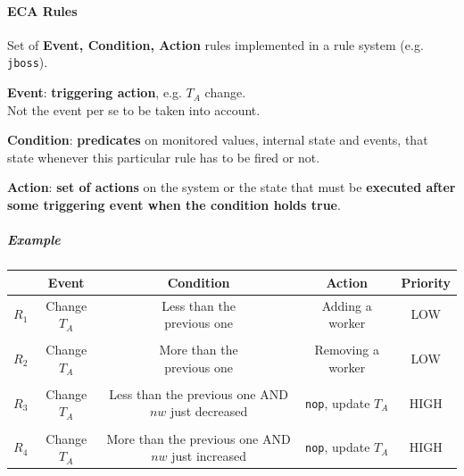 \documentclass[10pt]{report}
\begin{document}
\paragraph{ECA Rules} Set of \textbf{Event, Condition, Action} rules implemented in a rule system (e.g. \texttt{jboss}).\begin{list}{}{}
	\item \textbf{Event}: \textbf{triggering action}, e.g. $T_A$ change.\\
	Not the event per se to be taken into account.
	\item \textbf{Condition}: \textbf{predicates} on monitored values, internal state and events, that state whenever this particular rule has to be fired or not.
	\item \textbf{Action}: \textbf{set of actions} on the system or the state that must be \textbf{executed after some triggering event when the condition holds true}.
\end{list}
\subparagraph{Example}
\begin{center}
	\begin{tabular}{c | c c c c}
	& \textbf{Event} & \textbf{Condition} & \textbf{Action} & \textbf{Priority}\\
	\hline
	$R_1$ & Change $T_A$ & \makecell{Less than the\\previous one} & Adding a worker & LOW\\\\
	$R_2$ & Change $T_A$ & \makecell{More than the\\previous one} & Removing a worker & LOW\\\\
	$R_3$ & Change $T_A$ & \makecell{Less than the\\previous one AND\\$nw$ just decreased} & \texttt{nop}, update $T_A$ & HIGH\\\\
	$R_4$ & Change $T_A$ & \makecell{More than the\\previous one AND\\$nw$ just increased} & \texttt{nop}, update $T_A$ & HIGH
	\end{tabular}
\end{center}
\end{document}
